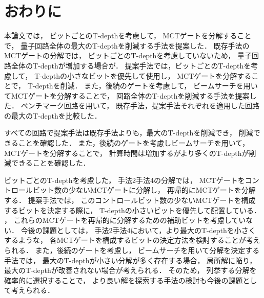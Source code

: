 \chapter{おわりに}
本論文では，
ビットごとのT-depthを考慮して，
MCTゲートを分解することで，
量子回路全体の最大のT-depthを削減する手法を提案した．
既存手法のMCTゲートの分解では，
ビットごとのT-depthを考慮していないため，
量子回路全体のT-depthが増加する場合が．
提案手法では，ビットごとのT-depthを考慮して，
T-depthの小さなビットを優先して使用し，
MCTゲートを分解することで，
T-depthを削減．
また，後続のゲートを考慮して，
ビームサーチを用いてMCTゲートを分解することで，
回路全体のT-depthを削減する手法を提案した．
ベンチマーク回路を用いて，
既存手法，提案手法それぞれを適用した回路の最大のT-depthを比較した．
\par
{}すべての回路で提案手法は既存手法よりも，最大のT-depthを削減でき，
削減できることを確認した．
また，後続のゲートを考慮しビームサーチを用いて，
MCTゲートを分解することで，
計算時間は増加するがより多くのT-depthが削減できることを確認した．
\par
ビットごとのT-depthを考慮した，
手法2手法4の分解では，
MCTゲートをコントロールビット数の少ないMCTゲートに分解し，
再帰的にMCTゲートを分解する．
提案手法では，
このコントロールビット数の少ないMCTゲートを構成するビットを決定する際に，
T-depthの小さいビットを優先して配置している．
，
これらのMCTゲートを再帰的に分解するための補助ビットを考慮していない．
今後の課題としては，
手法2手法4において，より最大のT-depthを小さくするような，
各MCTゲートを構成するビットの決定方法を検討することが考えられる．
また，後続のゲートを考慮し，
ビームサーチを用いて分解を決定する手法では，
最大のT-depthが小さい分解が多く存在する場合，
局所解に陥り，
最大のT-depthが改善されない場合が考えられる．
そのため，
列挙する分解を確率的に選択することで，
より良い解を探索する手法の検討も今後の課題として考えられる．
 \begin{comment} 
 \begin{itemize}
   \item 得られた成果
   \item 結論
   \item 課題
     \begin{itemize}
       \item 再帰的に分解する場合にT-depth最小となる分解
       \item ビームサーチの改善
     \end{itemize}
\end{itemize}
\end{comment} 